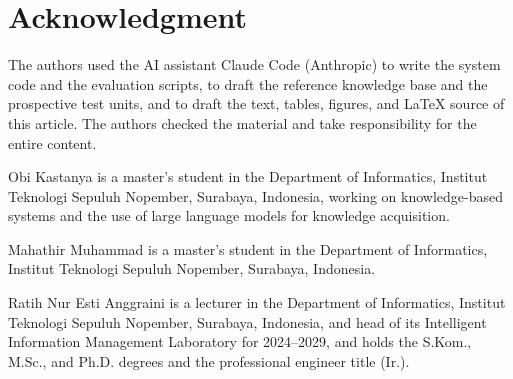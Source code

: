 \documentclass{ieeeaccess}
\begin{document}
\section*{Acknowledgment}
The authors used the AI assistant Claude Code (Anthropic) to write the system code and the evaluation scripts, to draft the reference knowledge base and the prospective test units, and to draft the text, tables, figures, and LaTeX source of this article. The authors checked the material and take responsibility for the entire content.




\begin{IEEEbiographynophoto}{Obi Kastanya}
is a master's student in the Department of Informatics, Institut Teknologi Sepuluh Nopember, Surabaya, Indonesia, working on knowledge-based systems and the use of large language models for knowledge acquisition.
\end{IEEEbiographynophoto}

\begin{IEEEbiographynophoto}{Mahathir Muhammad}
is a master's student in the Department of Informatics, Institut Teknologi Sepuluh Nopember, Surabaya, Indonesia.
\end{IEEEbiographynophoto}

\begin{IEEEbiographynophoto}{Ratih Nur Esti Anggraini}
is a lecturer in the Department of Informatics, Institut Teknologi Sepuluh Nopember, Surabaya, Indonesia, and head of its Intelligent Information Management Laboratory for 2024--2029, and holds the S.Kom., M.Sc., and Ph.D. degrees and the professional engineer title (Ir.).
\end{IEEEbiographynophoto}

\EOD
\end{document}
